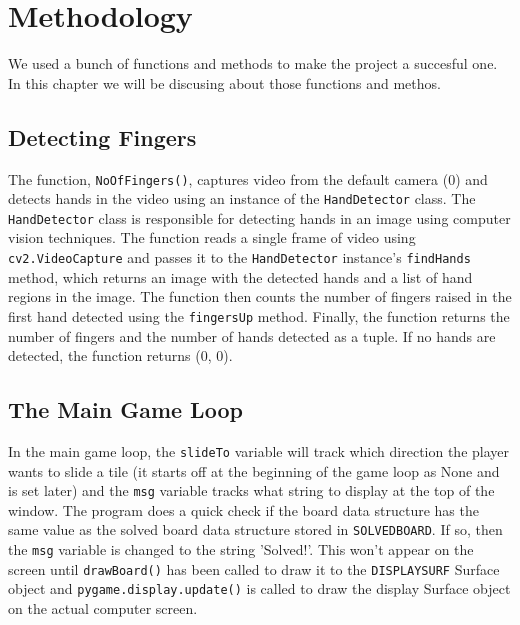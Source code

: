 \chapter{Methodology} %
\label{cha:chapter label} %
We used a bunch of functions and methods to make the project a succesful one. In this chapter we will be discusing about those functions and methos.

\section{Detecting Fingers} %
\label{sec:section label} %
The function, \texttt{NoOfFingers()}, captures video from the default camera (0) and detects hands in the video using an instance of the \texttt{HandDetector} class. The \texttt{HandDetector} class is responsible for detecting hands in an image using computer vision techniques. The function reads a single frame of video using \texttt{cv2.VideoCapture} and passes it to the \texttt{HandDetector} instance's \texttt{findHands} method, which returns an image with the detected hands and a list of hand regions in the image. The function then counts the number of fingers raised in the first hand detected using the \texttt{fingersUp} method. Finally, the function returns the number of fingers and the number of hands detected as a tuple. If no hands are detected, the function returns (0, 0).


 \section{The Main Game Loop} %
\label{sec:section label}
In the main game loop, the \texttt{slideTo} variable will track which direction the player wants to slide a tile (it starts off at the beginning of the game loop as None and is set later) and the \texttt{msg} variable tracks what string to display at the top of the window. The program does a quick check if the board data structure has the same value as the solved board data structure stored in \texttt{SOLVEDBOARD}. If so, then the \texttt{msg} variable is changed to the string 'Solved!'.
This won’t appear on the screen until \texttt{drawBoard()} has been called to draw it to the \texttt{DISPLAYSURF} Surface object and \texttt{pygame.display.update()} is called to draw the display Surface object on the actual computer screen.

